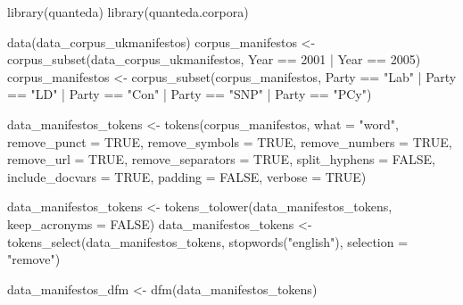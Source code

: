 \documentclass[
]{article}
\newenvironment{Shaded}{\begin{snugshade}}{\end{snugshade}}
\newcommand{\AttributeTok}[1]{\textcolor[rgb]{0.77,0.63,0.00}{#1}}
\newcommand{\ConstantTok}[1]{\textcolor[rgb]{0.00,0.00,0.00}{#1}}
\newcommand{\DecValTok}[1]{\textcolor[rgb]{0.00,0.00,0.81}{#1}}
\newcommand{\FunctionTok}[1]{\textcolor[rgb]{0.00,0.00,0.00}{#1}}
\newcommand{\NormalTok}[1]{#1}
\newcommand{\OtherTok}[1]{\textcolor[rgb]{0.56,0.35,0.01}{#1}}
\newcommand{\SpecialCharTok}[1]{\textcolor[rgb]{0.00,0.00,0.00}{#1}}
\newcommand{\StringTok}[1]{\textcolor[rgb]{0.31,0.60,0.02}{#1}}
\begin{document}
\begin{Shaded}
\begin{Highlighting}[]
\FunctionTok{library}\NormalTok{(quanteda)}
\FunctionTok{library}\NormalTok{(quanteda.corpora)}

\FunctionTok{data}\NormalTok{(data\_corpus\_ukmanifestos)}
\NormalTok{corpus\_manifestos }\OtherTok{\textless{}{-}} \FunctionTok{corpus\_subset}\NormalTok{(data\_corpus\_ukmanifestos,}
\NormalTok{    Year }\SpecialCharTok{==} \DecValTok{2001} \SpecialCharTok{|}\NormalTok{ Year }\SpecialCharTok{==} \DecValTok{2005}\NormalTok{)}
\NormalTok{corpus\_manifestos }\OtherTok{\textless{}{-}} \FunctionTok{corpus\_subset}\NormalTok{(corpus\_manifestos, Party }\SpecialCharTok{==}
    \StringTok{"Lab"} \SpecialCharTok{|}\NormalTok{ Party }\SpecialCharTok{==} \StringTok{"LD"} \SpecialCharTok{|}\NormalTok{ Party }\SpecialCharTok{==} \StringTok{"Con"} \SpecialCharTok{|}\NormalTok{ Party }\SpecialCharTok{==} \StringTok{"SNP"} \SpecialCharTok{|}
\NormalTok{    Party }\SpecialCharTok{==} \StringTok{"PCy"}\NormalTok{)}

\NormalTok{data\_manifestos\_tokens }\OtherTok{\textless{}{-}} \FunctionTok{tokens}\NormalTok{(corpus\_manifestos, }\AttributeTok{what =} \StringTok{"word"}\NormalTok{,}
    \AttributeTok{remove\_punct =} \ConstantTok{TRUE}\NormalTok{, }\AttributeTok{remove\_symbols =} \ConstantTok{TRUE}\NormalTok{, }\AttributeTok{remove\_numbers =} \ConstantTok{TRUE}\NormalTok{,}
    \AttributeTok{remove\_url =} \ConstantTok{TRUE}\NormalTok{, }\AttributeTok{remove\_separators =} \ConstantTok{TRUE}\NormalTok{, }\AttributeTok{split\_hyphens =} \ConstantTok{FALSE}\NormalTok{,}
    \AttributeTok{include\_docvars =} \ConstantTok{TRUE}\NormalTok{, }\AttributeTok{padding =} \ConstantTok{FALSE}\NormalTok{, }\AttributeTok{verbose =} \ConstantTok{TRUE}\NormalTok{)}

\NormalTok{data\_manifestos\_tokens }\OtherTok{\textless{}{-}} \FunctionTok{tokens\_tolower}\NormalTok{(data\_manifestos\_tokens,}
    \AttributeTok{keep\_acronyms =} \ConstantTok{FALSE}\NormalTok{)}
\NormalTok{data\_manifestos\_tokens }\OtherTok{\textless{}{-}} \FunctionTok{tokens\_select}\NormalTok{(data\_manifestos\_tokens,}
    \FunctionTok{stopwords}\NormalTok{(}\StringTok{"english"}\NormalTok{), }\AttributeTok{selection =} \StringTok{"remove"}\NormalTok{)}

\NormalTok{data\_manifestos\_dfm }\OtherTok{\textless{}{-}} \FunctionTok{dfm}\NormalTok{(data\_manifestos\_tokens)}
\end{Highlighting}
\end{Shaded}
\end{document}
